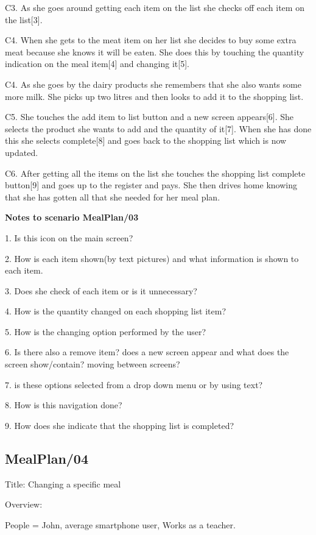 	C3. As she goes around getting each item on the list she checks off each item on the list[3].
	
	C4. When she gets to the meat item on her list she decides to buy some extra meat because she knows it will be eaten. She does this by touching the quantity indication on the meal item[4] and changing it[5]. 	
	
	C4. As she goes by the dairy products she remembers that she also wants some more milk. She picks up two litres and then looks to add it to the shopping list.
	
	C5. She touches the add item to list button and a new screen appears[6]. She selects the product she wants to add and the quantity of it[7]. When she has done this she selects complete[8] and goes back to the shopping list which is now updated.
	
	C6. After getting all the items on the list she touches the shopping list complete button[9] and goes up to the register and pays. She then drives home knowing that she has gotten all that she needed for her meal plan.    
	
\textbf{Notes to scenario MealPlan/03}

1. Is this icon on the main screen?

2. How is each item shown(by text pictures) and what information is shown to each item.

3. Does she check of each item or is it unnecessary?

4. How is the quantity changed on each shopping list item?  

5. How is the changing option performed by the user?

6. Is there also a remove item? does a new screen appear and what does the screen show/contain? moving between screens?

7. is these options selected from a drop down menu or by using text?

8. How is this navigation done?

9. How does she indicate that the shopping list is completed?

\subsection{MealPlan/04} \label{MealPlan04}

Title: Changing a specific meal

Overview:
	
	People = John, average smartphone user, Works as a teacher.
	

